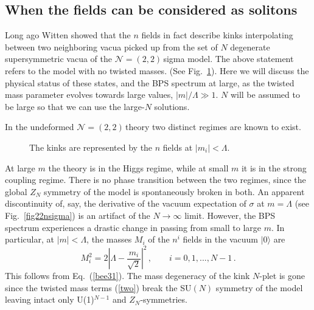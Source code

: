 \documentclass[epsfig,12pt]{article}
\def\beq{\begin{equation}}
\def\eeq{\end{equation}}
\newcommand{\ntt}{${\mathcal N}=(2,2)\,$}
\newcommand{\zn}{$Z_N$}
\def\beq{\begin{equation}}
\def\eeq{\end{equation}}
\begin{document}
{\subsection{When the  fields can be considered as solitons}
\label{wtnfcb}

Long ago Witten showed \cite{W79} that the $n$ fields in fact describe
kinks interpolating between two neighboring vacua picked up from the set of $N$ degenerate 
supersymmetric vacua
of the \ntt sigma model. The above statement refers to the model with no twisted masses.
(See Fig.~\ref{nkin}).
Here we will discuss the physical status of these states, and the BPS spectrum at large,
as the twisted mass parameter evolves towards large values, $|m|/\Lambda \gg1$.
$N$ will be assumed to be large so that we can use the large-$N$ solutions.

In the undeformed \ntt theory two distinct regimes are known to exist.
\begin{figure}
\epsfxsize=5cm
\centerline{\resizebox{5cm}{!}{}}
\caption{\small The kinks are represented by the $n$ fields at $|m_i|<\Lambda$. }
\label{nkin}
\end{figure}
At large $m$
the theory is in the Higgs regime, while at small $m$ it is in the
strong coupling regime.
There is no phase transition between the two regimes, since 
the global $Z_N$ symmetry of the model is spontaneously broken in both.
An apparent discontinuity of, say, the derivative of the vacuum expectation of $\sigma$ at
$m=\Lambda$ (see Fig.~\ref{fig22nsigma}) is an artifact of the $N\to\infty$ limit.
However, the BPS spectrum experiences a drastic change in passing from small to large $m$.
In particular, 
at $|m|<\Lambda$, the masses $M_i$ of the $n^i$ fields in the vacuum $|0\rangle$
are
\beq
M_i^2 = 2\left| \Lambda - \frac{m_i}{\sqrt 2}\right|^2\,,\qquad i=0,1, ..., N-1\,.
\label{nkma}
\eeq
This follows from Eq.~(\ref{bee31}). The mass degeneracy of the kink $N$-plet is gone
since the twisted mass terms (\ref{two}) break the SU$(N)$ symmetry of the model leaving intact only
U(1)$^{N-1}$ and \zn-symmetries.

}
\end{document}
